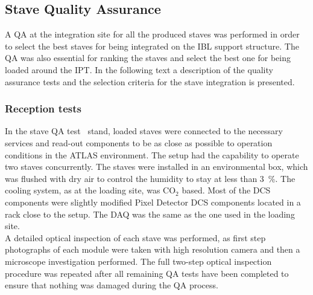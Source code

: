 
\subsection{Stave Quality Assurance}
%
%
%
A QA at the integration site for all the produced staves was performed in order to select the best staves for being integrated on the IBL support structure. The QA was also essential for ranking the staves and select the best one for being loaded around the IPT. In the following text a description of the quality assurance tests and the selection criteria for the stave integration is presented.

\subsubsection{Reception tests}
In the stave QA test~\cite{StaveQA_note} stand, loaded staves were connected to the necessary services and read-out components to be as close as possible to operation conditions in the ATLAS environment. The setup had the capability to operate two staves concurrently. 
The staves were installed in an environmental box, which was flushed with dry air to control the humidity to stay at less than \SI{3}{\percent}. The cooling system, as at the loading site, was CO$_2$ based.
Most of the DCS components were slightly modified Pixel Detector DCS components located in a rack close to the setup. The DAQ was the same as the one used in the loading site.\\
%
A detailed optical inspection of each stave was performed, as first step photographs of each module were taken with high resolution camera and then a microscope investigation performed.
The full two-step optical inspection procedure was repeated after all remaining QA tests have been completed to ensure that nothing was damaged during the QA process.

